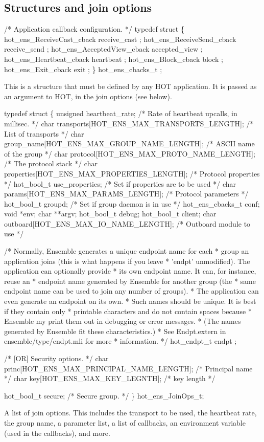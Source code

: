 \subsection{Structures and join options}
\begin{codebox}
/* Application callback configuration.
 */
typedef struct \{
  hot_ens_ReceiveCast_cback receive_cast ;
  hot_ens_ReceiveSend_cback receive_send ;
  hot_ens_AcceptedView_cback accepted_view ;
  hot_ens_Heartbeat_cback heartbeat ;
  hot_ens_Block_cback block ;
  hot_ens_Exit_cback exit ;
\} hot_ens_cbacks_t ;
\end{codebox}
This is a structure that must be defined by any HOT application. It
is passed as an argument to HOT, in the join options (see below).

\begin{codebox}
typedef struct \{
    unsigned heartbeat_rate;	/* Rate of heartbeat upcalls, in millisec. */
    char transports[HOT_ENS_MAX_TRANSPORTS_LENGTH]; /* List of transports */
    char group_name[HOT_ENS_MAX_GROUP_NAME_LENGTH]; /* ASCII name of the group */
    char protocol[HOT_ENS_MAX_PROTO_NAME_LENGTH]; /* The protocol stack */
    char properties[HOT_ENS_MAX_PROPERTIES_LENGTH]; /* Protocol properties */
    hot_bool_t use_properties;		/* Set if properties are to be used */
    char params[HOT_ENS_MAX_PARAMS_LENGTH]; /* Protocol parameters */
    hot_bool_t groupd;			/* Set if group daemon is in use */
    hot_ens_cbacks_t conf;
    void *env;
    char **argv;
    hot_bool_t debug;
    hot_bool_t client;
    char outboard[HOT_ENS_MAX_IO_NAME_LENGTH]; /* Outboard module to use */

    /* Normally, Ensemble generates a unique endpoint name for each
     * group an application joins (this is what happens if you leave
     * 'endpt' unmodified).  The application can optionally provide
     * its own endpoint name.  It can, for instance, reuse an
     * endpoint name generated by Ensemble for another group (the
     * same endpoint name can be used to join any number of groups).
     * The application can even generate an endpoint on its own.
     * Such names should be unique.  It is best if they contain only
     * printable characters and do not contain spaces because
     * Ensemble my print them out in debugging or error messages.
     * (The names generated by Ensemble fit these characteristics.)
     * See Endpt.extern in ensemble/type/endpt.mli for more
     * information.
     */
    hot_endpt_t endpt ;

    /* [OR] Security options. 
     */
    char princ[HOT_ENS_MAX_PRINCIPAL_NAME_LENGTH]; /* Principal name */
    char key[HOT_ENS_MAX_KEY_LEGNTH];             /* key length */

    hot_bool_t secure;                      /* Secure group. */
\} hot_ens_JoinOps_t;
\end{codebox}
A list of join options. This includes the transport to be used, the
heartbeat rate, the group name, a parameter list, a list of callbacks,
an environment variable (used in the callbacks), and more. 

